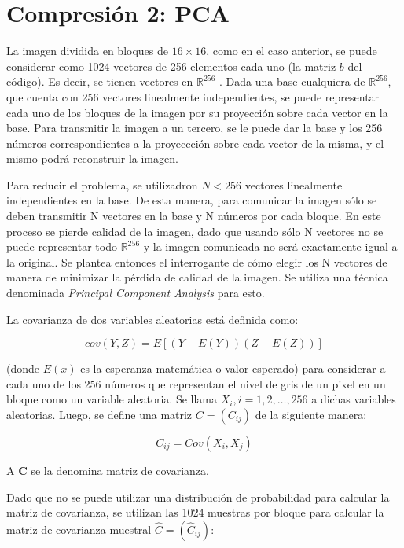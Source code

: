 \documentclass[twocolumn,a4paper,10pt]{article}
\begin{document}
\section{Compresi\'on 2: PCA}
\label{sec:compresion2}

La imagen dividida en bloques de $16 \times 16$, como en el caso anterior, se puede considerar como 1024 vectores de 256 elementos cada uno (la matriz $b$ del código). 
Es decir, se tienen vectores en $\mathbb{R}^{256}$ . Dada una base cualquiera de $\mathbb{R}^{256}$, que cuenta con 256 vectores linealmente independientes, se puede 
representar cada uno de los bloques de la imagen por su proyecci\'on sobre cada vector en la base.  Para transmitir la imagen a un tercero, se le puede dar la base y 
los 256 n\'umeros correspondientes a la proyeccci\'on sobre cada vector de la misma, y el mismo podrá reconstruir la imagen.

Para reducir el problema, se utilizadron $N < 256$ vectores linealmente independientes en la base. De esta manera, para comunicar la imagen s\'olo
se deben transmitir N vectores en la base y N n\'umeros por cada bloque. En este proceso se pierde calidad de la imagen, dado que usando s\'olo N vectores 
no se puede representar todo $\mathbb{R}^{256}$ y la imagen comunicada no será exactamente igual a la original. Se plantea entonces el interrogante de cómo 
elegir los N vectores de manera de minimizar la p\'erdida de calidad de la imagen. 
Se utiliza una técnica denominada \textit{Principal Component Analysis}\cite{PCA} para esto.

La covarianza de dos variables aleatorias está definida como:

\begin{equation}
    cov(Y, Z) = E [(Y - E(Y )) (Z - E(Z))]
\end{equation}

(donde $E(x)$ es la esperanza matem\'atica o valor esperado) para considerar a cada uno de los 256 n\'umeros que representan el nivel de gris de un pixel 
en un bloque como un variable aleatoria.  Se llama $X_{i}, i = 1, 2, \dotsc, 256$ a dichas variables aleatorias. Luego, se define una matriz $C = (C_{ij} )$ 
de la siguiente manera:

\begin{equation}
    C_{ij} = Cov(X_{i}, X_{j})
\end{equation}

A $\textbf{C}$ se la denomina matriz de covarianza.

Dado que no se puede utilizar una distribución de probabilidad para calcular la matriz de covarianza, se utilizan las 1024 muestras por bloque para calcular 
la matriz de covarianza muestral $\widehat{C} = (\widehat{C}_{ij})$:
\end{document}
